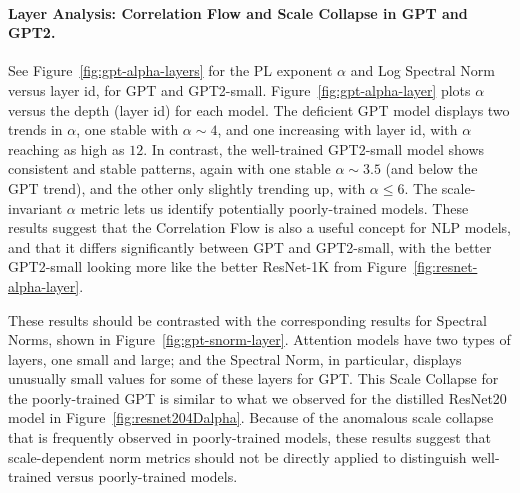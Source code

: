 \paragraph{Layer Analysis: Correlation Flow and Scale Collapse in GPT and GPT2.} 

See Figure~\ref{fig:gpt-alpha-layers} for the PL exponent $\alpha$ and Log Spectral Norm versus layer id, for GPT and GPT2-small.
Figure~\ref{fig:gpt-alpha-layer} plots $\alpha$ versus the depth (layer id) for each model.
The deficient GPT model displays two trends in $\alpha$, one stable with $\alpha\sim 4$, and one increasing with layer id, with $\alpha$ reaching as high as $12$.
In contrast, the well-trained GPT2-small model shows consistent and stable patterns, again with one stable $\alpha\sim 3.5$ (and below the GPT trend), and the other only slightly trending up, with $\alpha\le 6$. 
The scale-invariant $\alpha$ metric lets us identify potentially poorly-trained models.
These results suggest that the Correlation Flow is also a useful concept for NLP models, and that it differs significantly between GPT and GPT2-small, with the better GPT2-small looking more like the better ResNet-1K from Figure~\ref{fig:resnet-alpha-layer}.

These results should be contrasted with the corresponding results for Spectral Norms, shown in Figure~\ref{fig:gpt-snorm-layer}.
Attention models have two types of layers, one small and large; and the Spectral Norm, in particular, displays unusually small values for some of these layers for GPT.
This Scale Collapse for the poorly-trained GPT is similar to what we observed for the distilled ResNet20 model in Figure~\ref{fig:resnet204Dalpha}.
Because of the anomalous scale collapse that is frequently observed in poorly-trained models, these results suggest that scale-dependent norm metrics should not be directly applied to distinguish well-trained versus poorly-trained models. 


